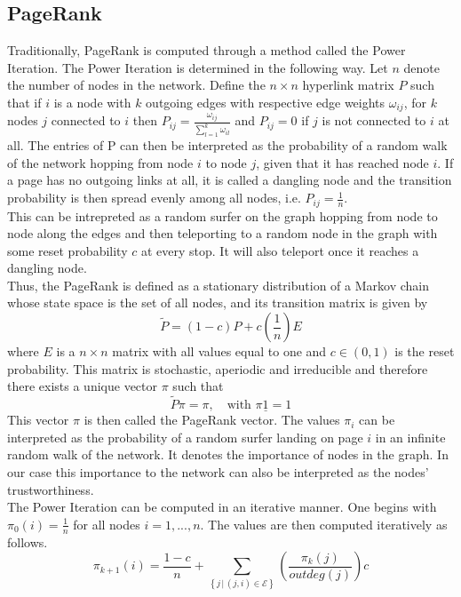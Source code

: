 \documentclass[sigconf]{acmart}
\theoremstyle{definition}
\begin{document}
\subsection{PageRank}
\label{subsec:PageRank}
Traditionally, PageRank is computed through a method called the Power Iteration. The Power Iteration is determined in the following way. Let $n$ denote the number of nodes in the network. Define the $n\times{}n$ hyperlink matrix $P$ such that if $i$ is a node with $k$ outgoing edges with respective edge weights $\omega_{ij}$, for $k$ nodes $j$ connected to $i$ then $P_{ij}=\frac{\omega_{ij}}{\sum_{l=1}^{k}\omega_{il}}$ and $P_{ij}=0$ if $j$ is not connected to $i$ at all. The entries of P can then be interpreted as the probability of a random walk of the network hopping from node $i$ to node $j$, given that it has reached node $i$. If a page has no outgoing links at all, it is called a dangling node and the transition probability is then spread evenly among all nodes, i.e. $P_{ij}=\frac{1}{n}$.\vspace{1em}\\

\noindent This can be intrepreted as a random surfer on the graph hopping from node to node along the edges and then teleporting to a random node in the graph with some reset probability $c$ at every stop. It will also teleport once it reaches a dangling node.\vspace{1em}\\

\noindent Thus, the PageRank is defined as a stationary distribution of a Markov chain whose state space is the set of all nodes, and its transition matrix is given by 
\[ 
\tilde{P} = (1-c)P + c\left(\frac{1}{n}\right)E 
\]
where $E$ is a $n\times{}n$ matrix with all values equal to one and $c\in{}(0,1)$ is the reset probability. This matrix is stochastic, aperiodic and irreducible and therefore there exists a unique vector $\pi$ such that 
\[
\tilde{P}\pi = \pi,\quad \textrm{with } \pi\underline{1} = 1 
\]
This vector $\pi$ is then called the PageRank vector. The values $\pi_i$ can be interpreted as the probability of a random surfer landing on page $i$ in an infinite random walk of the network. It denotes the importance of nodes in the graph. In our case this importance to the network can also be interpreted as the nodes' trustworthiness. \vspace{1em}\\

\noindent The Power Iteration can be computed in an iterative manner. One begins with $\pi_0(i)=\frac{1}{n}$ for all nodes $i=1,...,n$. The values are then computed iteratively as follows. 
\[
\pi_{k+1}(i) = \frac{1-c}{n} + \sum_{\left\lbrace j\,|\,(j,i)\in\mathcal{E}\right\rbrace}\left(\frac{\pi_k(j)}{outdeg(j)}\right)c 
\]
\end{document}
